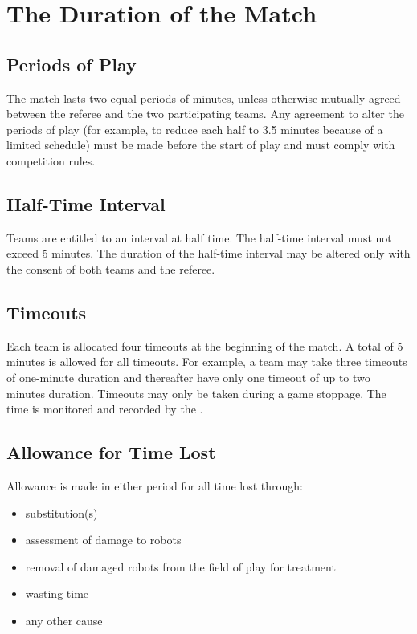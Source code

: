\section{The Duration of the Match}\label{sec:duration-of-the-match}

\subsection{Periods of Play}
The match lasts two equal periods of   minutes, unless otherwise mutually agreed between the referee and the two participating teams.
Any agreement to alter the periods of play (for example, to reduce each half to 3.5 minutes because of a limited schedule) must be made before the start of play and must comply with competition rules.

\subsection{Half-Time Interval}
Teams are entitled to an interval at half time.
The half-time interval must not exceed 5 minutes.
The duration of the half-time interval may be altered only with the consent of both teams and the referee.

\subsection{Timeouts}\label{subsec:duration-of-the-match-timeouts}
Each team is allocated four timeouts at the beginning of the match.
A total of 5 minutes is allowed for all timeouts.
For example, a team may take three timeouts of one-minute duration and thereafter have only one timeout of up to two minutes duration.
Timeouts may only be taken during a game stoppage.
The time is monitored and recorded by the .

\subsection{Allowance for Time Lost}
Allowance is made in either period for all time lost through:

\begin{itemize}
\item substitution(s)
\item assessment of damage to robots
\item removal of damaged robots from the field of play for treatment
\item wasting time
\item any other cause
\end{itemize}


